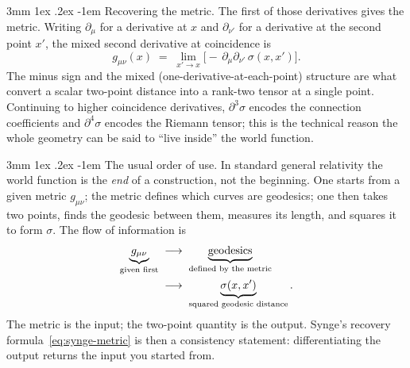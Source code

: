 \documentclass[%
 reprint, amsmath,amssymb, aps, prb, ]{revtex4-2}
\makeatletter
\numberwithin{equation}{section}
\renewcommand\paragraph{%
  \@startsection{paragraph}{4}{\z@}%
    {3mm \@plus 1ex \@minus .2ex}%
    {-1em}%
    {\normalfont\normalsize\itshape}}
\makeatother
\begin{document}
\paragraph{Recovering the metric.}
The first of those derivatives gives the metric. Writing $\partial_\mu$ for a derivative at $x$ and $\partial_{\nu'}$ for a derivative at the second point $x'$, the mixed second derivative at coincidence is
\begin{equation}
g_{\mu\nu}(x) \;=\; \lim_{x'\to x}\big[-\,\partial_\mu\partial_{\nu'}\,\sigma(x,x')\big].
\label{eq:synge-metric}
\end{equation}
The minus sign and the mixed (one-derivative-at-each-point) structure are what convert a scalar two-point distance into a rank-two tensor at a single point. Continuing to higher coincidence derivatives, $\partial^3\sigma$ encodes the connection coefficients and $\partial^4\sigma$ encodes the Riemann tensor; this is the technical reason the whole geometry can be said to ``live inside'' the world function.

\paragraph{The usual order of use.}
In standard general relativity the world function is the \emph{end} of a construction, not the beginning. One starts from a given metric $g_{\mu\nu}$; the metric defines which curves are geodesics; one then takes two points, finds the geodesic between them, measures its length, and squares it to form $\sigma$. The flow of information is
\begin{align}
\underbrace{g_{\mu\nu}}_{\text{given first}}
&\;\longrightarrow\;
\underbrace{\text{geodesics}}_{\text{defined by the metric}}
\notag\\
&\;\longrightarrow\;
\underbrace{\sigma(x,x')}_{\text{squared geodesic distance}}.
\label{eq:usual-order}
\end{align}
The metric is the input; the two-point quantity is the output. Synge's recovery formula~\eqref{eq:synge-metric} is then a consistency statement: differentiating the output returns the input you started from.
\end{document}
